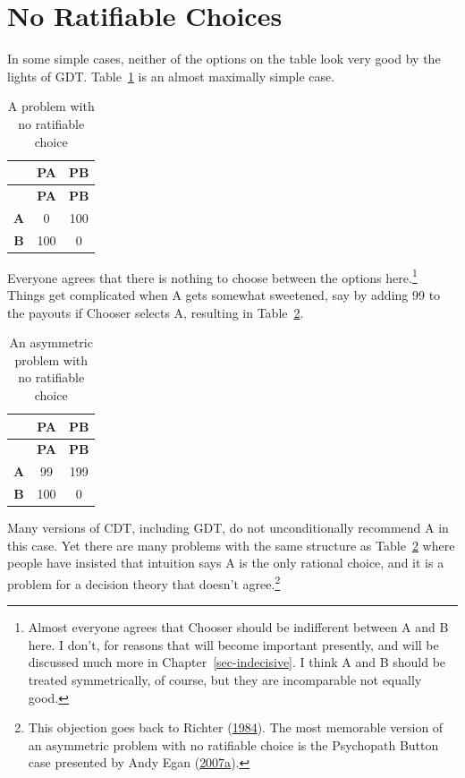\documentclass[
  12pt,
  letterpaper,
  DIV=11,
  numbers=noendperiod]{scrreprt}
\begin{document}
\hypertarget{sec-no-ratify}{%
\section{No Ratifiable Choices}\label{sec-no-ratify}}

In some simple cases, neither of the options on the table look very good
by the lights of GDT. Table~\ref{tbl-no-ratify-1} is an almost maximally
simple case.

\hypertarget{tbl-no-ratify-1}{}
\begin{longtable}[]{@{}ccc@{}}
\caption{\label{tbl-no-ratify-1}A problem with no ratifiable
choice}\tabularnewline
\toprule\noalign{}
& \textbf{PA} & \textbf{PB} \\
\midrule\noalign{}
\endfirsthead
\toprule\noalign{}
& \textbf{PA} & \textbf{PB} \\
\midrule\noalign{}
\endhead
\bottomrule\noalign{}
\endlastfoot
\textbf{A} & 0 & 100 \\
\textbf{B} & 100 & 0 \\
\end{longtable}

Everyone agrees that there is nothing to choose between the options
here.\footnote{Almost everyone agrees that Chooser should be indifferent
  between A and B here. I don't, for reasons that will become important
  presently, and will be discussed much more in
  Chapter~\ref{sec-indecisive}. I think A and B should be treated
  symmetrically, of course, but they are incomparable not equally good.}
Things get complicated when A gets somewhat sweetened, say by adding 99
to the payouts if Chooser selects A, resulting in
Table~\ref{tbl-no-ratify-2}.

\hypertarget{tbl-no-ratify-2}{}
\begin{longtable}[]{@{}ccc@{}}
\caption{\label{tbl-no-ratify-2}An asymmetric problem with no ratifiable
choice}\tabularnewline
\toprule\noalign{}
& \textbf{PA} & \textbf{PB} \\
\midrule\noalign{}
\endfirsthead
\toprule\noalign{}
& \textbf{PA} & \textbf{PB} \\
\midrule\noalign{}
\endhead
\bottomrule\noalign{}
\endlastfoot
\textbf{A} & 99 & 199 \\
\textbf{B} & 100 & 0 \\
\end{longtable}

Many versions of CDT, including GDT, do not unconditionally recommend A
in this case. Yet there are many problems with the same structure as
Table~\ref{tbl-no-ratify-2} where people have insisted that intuition
says A is the only rational choice, and it is a problem for a decision
theory that doesn't agree.\footnote{This objection goes back to Richter
  (\protect\hyperlink{ref-Richter1984}{1984}). The most memorable
  version of an asymmetric problem with no ratifiable choice is the
  Psychopath Button case presented by Andy Egan
  (\protect\hyperlink{ref-Egan2007}{2007a}).}
\end{document}
